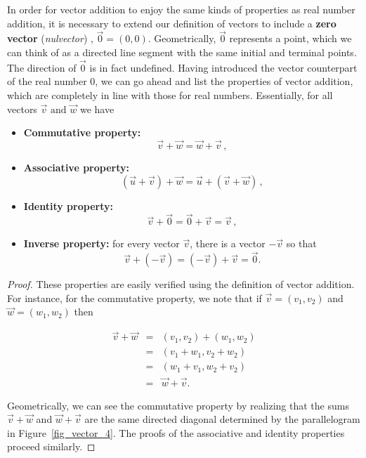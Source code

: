 In order for vector addition to enjoy the same kinds of properties as real number addition, it is necessary to extend our definition of vectors to include a \textbf{zero vector} (\textit{nulvector})  , $\vec{0} = \left(0, 0\right)$.  Geometrically,  $\vec{0}$ represents a point, which we can think of as a directed line segment with the same initial and terminal points. The direction of $\vec{0}$ is in fact undefined. Having introduced the vector counterpart of the real number 0, we can go ahead and list the properties of vector addition, which are completely in line with those for real numbers. Essentially, for all vectors $\vec{v} \text{ and } \vec{w}$ we have


\begin{itemize}

\item  \textbf{Commutative property:}  
$$\vec{v} + \vec{w} = \vec{w} + \vec{v}\,,$$

\item  \textbf{Associative property:}  
$$\left(\vec{u} + \vec{v}\right) + \vec{w} = \vec{u} + \left(\vec{v} + \vec{w}\right)\,,$$

\item  \textbf{Identity property:} 
 \[\vec{v} + \vec{0} = \vec{0} + \vec{v} = \vec{v}\,,\] 

\item  \textbf{Inverse property:} for every vector $\vec{v}$, there is a vector $-\vec{v}$ so that \[\vec{v} + (-\vec{v}) = (-\vec{v}) + \vec{v} = \vec{0}.\] 

\end{itemize}

\ifanalysis
\begin{proof}
These properties are easily verified using the definition of vector addition. For instance, for the commutative property, we note that if $\vec{v} = \left(v_1,v_2\right)$ and $\vec{w} = \left(w_1,w_2\right)$ then

\[ \begin{array}{rcl} \vec{v} + \vec{w}  & = &  \left( v_1, v_2 \right) +  \left(  w_1, w_2 \right) \\
& = & \left( v_1 + w_1, v_2 + w_2 \right) \\
& = &  \left( w_1 + v_1, w_2 + v_2 \right) \\
& = & \vec{w} + \vec{v}. \end{array} \]


Geometrically, we can see the commutative property by realizing that the sums $\vec{v}+\vec{w}$ and $\vec{w} + \vec{v}$ are the same directed diagonal determined by the parallelogram in Figure~\ref{fig_vector_4}. The proofs of the associative and identity properties proceed similarly. 
\end{proof}
\fi

